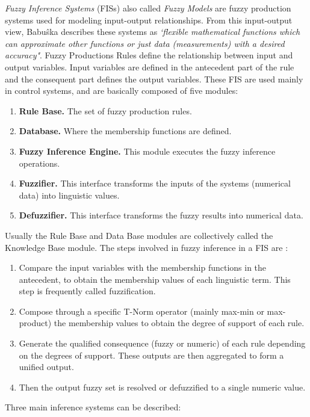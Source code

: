 \textit{Fuzzy Inference Systems} (FISs) also called \textit{Fuzzy
Models} are fuzzy production systems used for modeling input-output
relationships. From this input-output view, Babuŝka
\cite{babuvska1996fuzzy} describes these systems as \textit{`flexible
mathematical functions which can approximate other functions or just
data (measurements) with a desired accuracy"}. Fuzzy Productions Rules
define the relationship between input and output variables. Input
variables are defined in the antecedent part of the rule and the
consequent part defines the output variables. These FIS are used
mainly in control systems, and are basically composed of five
modules\cite{babuvska1996fuzzy}:
\begin{enumerate}  
\item \textbf{Rule Base.} The set of fuzzy production rules.
\item \textbf{Database.} Where the membership functions are defined.
\item \textbf{Fuzzy Inference Engine.} This module executes the 
fuzzy inference operations.
\item \textbf{Fuzzifier.} This interface transforms the inputs 
of the systems (numerical data) into linguistic values.
\item \textbf{Defuzzifier.} This interface transforms the fuzzy 
results into numerical data.
\end{enumerate}
Usually the Rule Base and Data Base modules are collectively 
called the Knowledge Base module. The steps involved in fuzzy 
inference in a FIS are \cite{dubois1980fuzzy}:
\begin{enumerate} 
\item Compare the input variables with the membership functions 
in the antecedent, to obtain the membership values of each 
linguistic term. This step is frequently called fuzzification.
\item Compose through a specific T-Norm operator (mainly max-min 
or max-product) the membership values to obtain the degree of 
support of each rule.
\item Generate the qualified consequence (fuzzy or numeric) of 
each rule depending on the degrees of support. These outputs 
are then aggregated to form a unified output.
\item Then the output fuzzy set is resolved or defuzzified 
to a single numeric value.
\end{enumerate} 
Three main inference systems can be described:
